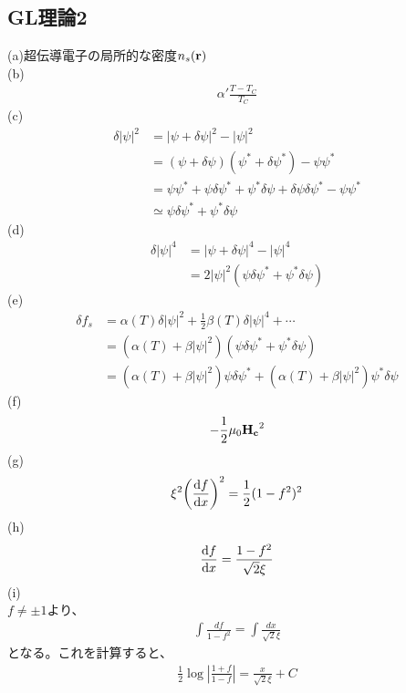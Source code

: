 \documentclass[a4paper,11pt]{jsarticle}
\numberwithin{equation}{section}
\begin{document}
\subsection{GL理論2}
\noindent
(a)超伝導電子の局所的な密度$n_s(\vb{r})$\\
(b)
\begin{align}
  \alpha' \frac{T-T_{C}}{T_C}
\end{align}
(c)
\begin{align}
  \delta|\psi|^2 &= |\psi + \delta\psi|^2 - |\psi|^2\\
  &= (\psi + \delta\psi)(\psi^* + \delta\psi^*) - \psi\psi^*\\
  &= \psi\psi^* + \psi\delta\psi^* + \psi^*\delta\psi + \delta\psi\delta\psi^* - \psi\psi^*\\
  &\simeq \psi\delta\psi^* + \psi^*\delta\psi 
\end{align}
(d)\\
\begin{align}
  \delta |\psi|^4 &= |\psi + \delta\psi|^4 - |\psi|^4\\
  &= 2|\psi|^2(\psi\delta\psi^* + \psi^*\delta\psi) 
\end{align}
(e)\\
\begin{align}
  \delta f_s &= \alpha(T)\delta|\psi|^2 + \frac{1}{2}\beta(T)\delta|\psi|^4 + \cdots\\
  &= (\alpha(T) + \beta |\psi|^2)(\psi\delta\psi^* + \psi^*\delta\psi)\\
  &= (\alpha(T) + \beta |\psi|^2)\psi\delta\psi^* + (\alpha(T) + \beta |\psi|^2)\psi^*\delta\psi
\end{align}
(f)\\
\begin{align}
  -\frac{1}{2}\mu_0\vb{H_c}^2
\end{align}
(g)\\
\begin{align}
  \xi^2\qty(\dv{f}{x})^2 = \frac{1}{2}(1-f^2)^2
\end{align}
(h)\\
\begin{align}
  \dv{f}{x} = \frac{1-f^2}{\sqrt{2}\xi}
\end{align}
(i)\\
$f \neq \pm 1$より、
\begin{align}
  \int \frac{df}{1-f^2} = \int \frac{dx}{\sqrt{2}\xi}
\end{align}
となる。これを計算すると、
\begin{align}
  \frac{1}{2}\log\left|\frac{1+f}{1-f}\right| = \frac{x}{\sqrt{2}\xi} + C
\end{align}
\end{document}
